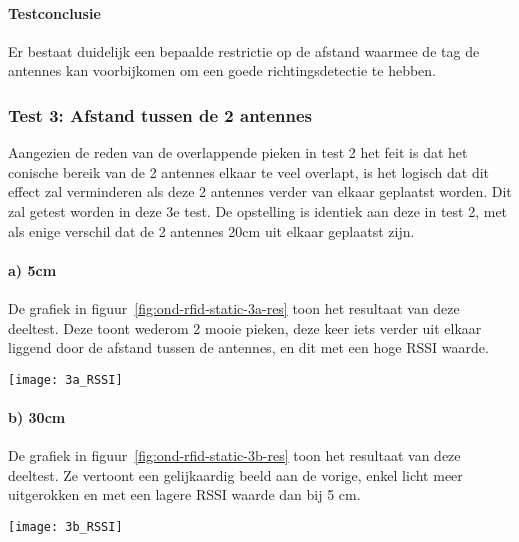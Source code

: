 \paragraph{Testconclusie}
Er bestaat duidelijk een bepaalde restrictie op de afstand waarmee de tag de antennes kan voorbijkomen om een goede richtingsdetectie te hebben. 

\subsubsection{Test 3: Afstand tussen de 2 antennes}
\label{sec:ond-rfid-2-3}
Aangezien de reden van de overlappende pieken in test 2 het feit is dat het conische bereik van de 2 antennes elkaar te veel overlapt, is het logisch dat dit effect zal verminderen als deze 2 antennes verder van elkaar geplaatst worden. Dit zal getest worden in deze 3e test. De opstelling is identiek aan deze in test 2, met als enige verschil dat de 2 antennes 20cm uit elkaar geplaatst zijn.

\paragraph{a) 5cm}
\begin{minipage}{0.55\textwidth}
De grafiek in figuur~\ref{fig:ond-rfid-static-3a-res} toon het resultaat van deze deeltest. Deze toont wederom 2 mooie pieken, deze keer iets verder uit elkaar liggend door de afstand tussen de antennes, en dit met een hoge RSSI waarde.
\end{minipage}
\hfill
\begin{minipage}{0.42\textwidth}
	\texttt{[image: 3a\_RSSI]}
	\label{fig:ond-rfid-static-3a-res}
\end{minipage}

\paragraph{b) 30cm}
\begin{minipage}{0.55\textwidth}
De grafiek in figuur~\ref{fig:ond-rfid-static-3b-res} toon het resultaat van deze deeltest. Ze vertoont een gelijkaardig beeld aan de vorige, enkel licht meer uitgerokken en met een lagere RSSI waarde dan bij 5 cm.
\end{minipage}
\hfill
\begin{minipage}{0.42\textwidth}
	\texttt{[image: 3b\_RSSI]}
	\label{fig:ond-rfid-static-3b-res}
\end{minipage}

